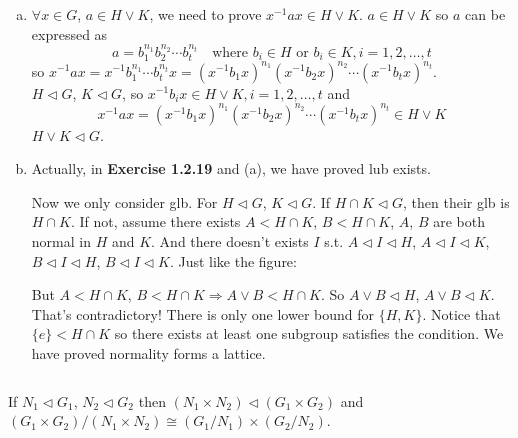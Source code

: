\begin{answer}
    \begin{enumerate}[(a)]
        \item $\forall x\in G$, $a\in H\vee K$, we need to prove $x^{-1}ax\in H\vee K$. $a\in H\vee K$ so $a$ can be expressed  as \[a=b_{1}^{n_{1}}b_{2}^{n_{2}}\cdots b_{t}^{n_{t}}\quad \text{where } b_{i}\in H \text{ or } b_{i}\in K, i=1,2,\dots,t\] so $x^{-1}ax= x^{-1}b_{1}^{n_{1}}\cdots b_{t}^{n_{t}}x =(x^{-1}b_{1}x)^{n_{1}}(x^{-1}b_{2}x)^{n_{2}}\cdots (x^{-1}b_{t}x)^{n_{t}}$.\\ $H\lhd G$, $K\lhd G$, so $x^{-1}b_{i}x\in H\vee K, i=1,2,\dots,t$ and \[x^{-1}ax=(x^{-1}b_{1}x)^{n_{1}}(x^{-1}b_{2}x)^{n_{2}}\cdots (x^{-1}b_{t}x)^{n_{t}}\in H\vee K\] $H\vee K\lhd G$.
        \item Actually, in \textbf{Exercise 1.2.19} and (a), we have proved lub exists.
        
        Now we only consider glb. For $H\lhd G$, $K\lhd G$. If $H\cap K\lhd G$, then their glb is $H\cap K$. If not, assume there exists $A<H\cap K$, $B<H\cap K$, $A$, $B$ are both normal in $H$ and $K$. And there doesn't exists $I$ s.t. $A\lhd I\lhd H$, $A\lhd I\lhd K$, $B\lhd I\lhd H$, $B\lhd I\lhd K$. Just like the figure:
        
        \begin{figure}[H]\centering
        \end{figure}
        But $A<H\cap K$, $B<H\cap K\Rightarrow A\vee B<H\cap K$. So $A\vee B\lhd H$, $A\vee B\lhd K$. That's contradictory! There is only one lower bound for $\{H,K\}$. Notice that $\{e\}<H\cap K$ so there exists at least one subgroup satisfies the condition. We have proved normality forms a lattice.
    \end{enumerate}
\end{answer}

$$ $$

\begin{ex}
    If $N_{1}\lhd G_{1}$, $N_{2}\lhd G_{2}$ then $(N_{1}\times N_{2})\lhd (G_{1}\times G_{2})$ and $(G_{1}\times G_{2})/(N_{1}\times N_{2})\cong (G_{1}/N_{1})\times(G_{2}/N_{2})$.
\end{ex}

